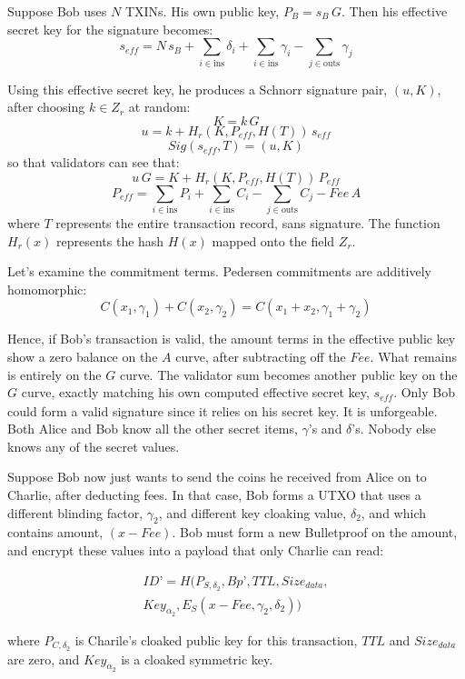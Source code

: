 \documentclass[8pt,fleqn,openany]{book}
\begin{document}
Suppose Bob uses $N$ TXINs. His own public key, $P_B = s_B \, G$. Then his effective secret key for the signature becomes:
$$s_{\mathit{eff}} = N \, s_B + \sum_{i \in \text{ins}} {\delta_i} + \sum_{i \in \text{ins}}{\gamma_i} - \sum_{j \in \text{outs}}{ \gamma_j}$$

Using this effective secret key, he produces a Schnorr signature pair, $(u, K)$, after choosing $k \in Z_r$ at random:
$$K = k \, G$$
$$u = k + H_r(K, P_{eff}, H(T)) \, s_{\mathit{eff}}$$
$$Sig(s_{eff},T) = (u, K)$$
so that validators can see that:
$$u \, G = K + H_r(K, P_{eff}, H(T)) \, P_{eff}$$
$$P_{\mathit{eff}} = \sum_{i \in \text{ins}}{P_i} + \sum_{i \in \text{ins}}{C_i} - \sum_{j \in \text{outs}}{C_j} - \mathit{Fee} \, A$$
where $T$ represents the entire transaction record, sans signature. The function $H_r(x)$ represents the hash $H(x)$ mapped onto the field $Z_r$.

Let’s examine the commitment terms. Pedersen commitments are additively homomorphic:
$$C(x_1, \gamma_1) + C(x_2, \gamma_2) = C(x_1 + x_2, \gamma_1 + \gamma_2)$$

Hence, if Bob’s transaction is valid, the amount terms in the effective public key show a zero balance on the $A$ curve, after subtracting off the $\mathit{Fee}$. What remains is entirely on the $G$ curve. The validator sum becomes another public key on the $G$ curve, exactly matching his own computed effective secret key, $s_{\mathit{eff}}$. Only Bob could form a valid signature since it relies on his secret key. It is unforgeable. Both Alice and Bob know all the other secret items, $\gamma$’s and $\delta$’s. Nobody else knows any of the secret values.

Suppose Bob now just wants to send the coins he received from Alice on to Charlie, after deducting fees. In that case, Bob forms a UTXO that uses a different blinding factor, $\gamma_2$, and different key cloaking value, $\delta_2$, and which contains amount, $(x - \mathit{Fee})$. Bob must form a new Bulletproof on the amount, and encrypt these values into a payload that only Charlie can read:

\begin{multline*}
ID’ = H(P_{S, \delta_2}, Bp’, TTL, Size_{data}, \\
          Key_{\alpha_2}, E_S(x - Fee, \gamma_2, \delta_2))
\end{multline*}

where $P_{C, \delta_2}$ is Charile’s cloaked public key for this transaction, $TTL$ and $Size_{data}$ are zero, and $Key_{\alpha_2}$ is a cloaked symmetric key. 
\end{document}
